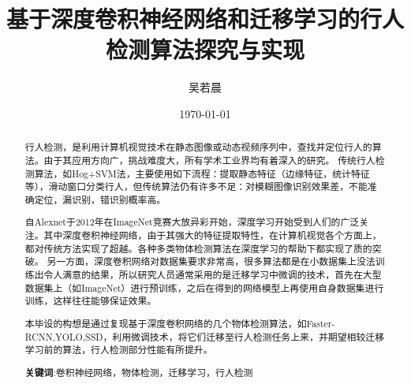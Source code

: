 \documentclass[12pt,a4paper,titlepage]{article}
\title{基于深度卷积神经网络和迁移学习的行人检测算法探究与实现}
\author{吴若晨}
\date{\today}
\begin{document}
\renewcommand{\figurename}{图}
\maketitle

\renewcommand{\abstractname}{\zihao{3} 摘要}
\begin{abstract}
\qquad 行人检测，是利用计算机视觉技术在静态图像或动态视频序列中，查找并定位行人的算法。由于其应用方向广，挑战难度大，所有学术工业界均有着深入的研究。
传统行人检测算法，如Hog+SVM法，主要使用如下流程：提取静态特征（边缘特征，统计特征等），滑动窗口分类行人，但传统算法仍有许多不足：对模糊图像识别效果差，不能准确定位，漏识别，错识别概率高。\par
自Alexnet于2012年在ImageNet竞赛大放异彩开始，深度学习开始受到人们的广泛关注。其中深度卷积神经网络，由于其强大的特征提取特性，在计算机视觉各个方面上，都对传统方法实现了超越。各种多类物体检测算法在深度学习的帮助下都实现了质的突破。
另一方面，深度卷积网络对数据集要求非常高，很多算法都是在小数据集上没法训练出令人满意的结果，所以研究人员通常采用的是迁移学习中微调的技术，首先在大型数据集上（如ImageNet）进行预训练，之后在得到的网络模型上再使用自身数据集进行训练，这样往往能够保证效果。\par
本毕设的构想是通过复现基于深度卷积网络的几个物体检测算法，如Faster-RCNN,YOLO,SSD，利用微调技术，将它们迁移至行人检测任务上来，并期望相较迁移学习前的算法，行人检测部分性能有所提升。
\begin{center}
{\textbf{关键词}:卷积神经网络，物体检测，迁移学习，行人检测}
\end{center}
\end{abstract}
\end{document}
